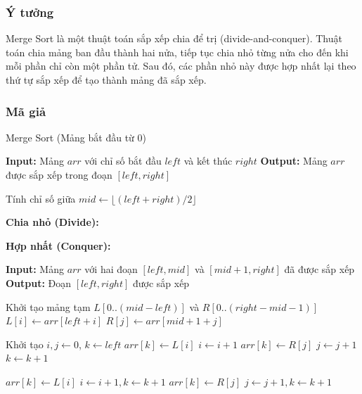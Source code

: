 \subsubsection{Ý tưởng}
Merge Sort là một thuật toán sắp xếp chia để trị (divide-and-conquer). Thuật toán chia mảng ban đầu thành hai nửa, tiếp tục chia nhỏ từng nửa cho đến khi mỗi phần chỉ còn một phần tử. Sau đó, các phần nhỏ này được hợp nhất lại theo thứ tự sắp xếp để tạo thành mảng đã sắp xếp. \cite{drozdek2023}

\subsubsection{Mã giả}

\begin{algorithm}[H]
\caption{Merge Sort (Mảng bắt đầu từ 0)}
\begin{algorithmic}[1]
    \State \textbf{Input:} Mảng $arr$ với chỉ số bắt đầu $left$ và kết thúc $right$
    \State \textbf{Output:} Mảng $arr$ được sắp xếp trong đoạn $[left, right]$
    
        \State Tính chỉ số giữa $mid \gets \lfloor (left + right) / 2 \rfloor$
        
        \State \textbf{Chia nhỏ (Divide):}
        \State {} 
        \State {} 
        
        \State \textbf{Hợp nhất (Conquer):}
        \State {} 
    \EndIf
\EndProcedure

    \State \textbf{Input:} Mảng $arr$ với hai đoạn $[left, mid]$ và $[mid+1, right]$ đã được sắp xếp
    \State \textbf{Output:} Đoạn $[left, right]$ được sắp xếp
    
    \State Khởi tạo mảng tạm $L[0..(mid-left)]$ và $R[0..(right-mid-1)]$
        \State $L[i] \gets arr[left + i]$
    \EndFor
        \State $R[j] \gets arr[mid + 1 + j]$
    \EndFor
    
    \State Khởi tạo $i, j \gets 0$, $k \gets left$
            \State $arr[k] \gets L[i]$
            \State $i \gets i + 1$
        \Else
            \State $arr[k] \gets R[j]$
            \State $j \gets j + 1$
        \EndIf
        \State $k \gets k + 1$
    \EndWhile
    
        \State $arr[k] \gets L[i]$
        \State $i \gets i + 1, k \gets k + 1$
    \EndWhile
        \State $arr[k] \gets R[j]$
        \State $j \gets j + 1, k \gets k + 1$
    \EndWhile
\EndProcedure
\end{algorithmic}
\end{algorithm}


